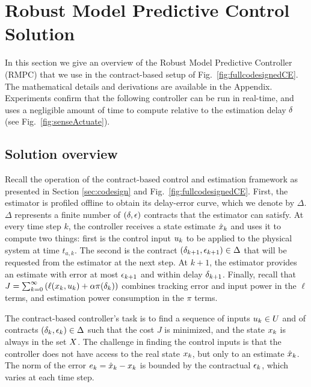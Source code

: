 \section{Robust Model Predictive Control Solution}
\label{robustMPC}

In this section we give an overview of the Robust Model Predictive Controller (RMPC) that we use in the contract-based setup of Fig.~\ref{fig:fullcodesignedCE}.
The mathematical details and derivations are available in the Appendix.
Experiments confirm that the following controller can be run in real-time, and uses a negligible amount of time to compute relative to the estimation delay $\delta$ (see Fig.~\ref{fig:senseActuate}).

\subsection{Solution overview}
Recall the operation of the contract-based control and estimation framework as presented in Section \ref{sec:codesign} and Fig.~\ref{fig:fullcodesignedCE}.
First, the estimator is profiled offline to obtain its delay-error curve, which we denote by $\Delta$.
$\Delta$ represents a finite number of $(\delta,\epsilon)$ contracts that the estimator can satisfy.
At every time step $k$, the controller receives a state estimate $\hat{x}_k$ and uses it to compute two things:
first is the control input $u_{k}$ to be applied to the physical system at time $t_{a,k}$.
The second is the contract $(\delta_{k+1}, \epsilon_{k+1}) \in \Delta$ that will be requested from the estimator at the next step.
At $k+1$, the estimator provides an estimate with error at most $\epsilon_{k+1}$ and within delay $\delta_{k+1}$.
Finally, recall that $J = \sum_{k=0}^{\infty}\left(\ell(x_k,u_k)+ \alpha \pi(\delta_k)\right)$ combines tracking error and input power in the $\ell$ terms, and estimation power consumption in the $\pi$ terms.

The contract-based controller's task is to find a sequence of inputs $u_k \in U$ and of contracts $(\delta_k, \epsilon_k) \in \Delta$ such that the cost $J$ is minimized, and the state $x_k$ is always in the set $X$.
The challenge in finding the control inputs is that the controller does not have access to the real state $x_k$, but only to an estimate $\hat{x}_k$. 
The norm of the error $e_k = \hat{x}_k - x_k$ is bounded by the contractual $\epsilon_k$, which varies at each time step.

